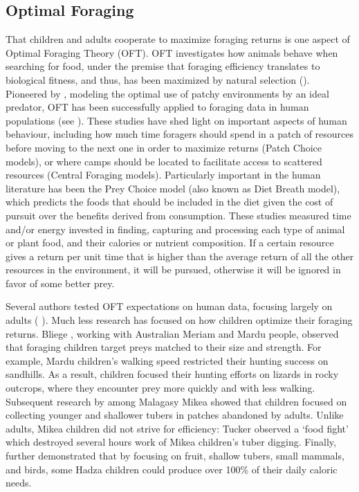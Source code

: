 \subsection{Optimal Foraging}
That children and adults cooperate to maximize foraging returns is one aspect of Optimal Foraging Theory (OFT). OFT investigates how animals behave when searching for food, under the premise that foraging efficiency translates to biological fitness, and thus, has been maximized by natural selection (\cite{pyke_optimal_1977}). Pioneered by \cite{macarthur_optimal_1966}, modeling the optimal use of patchy environments by an ideal predator, OFT has been successfully applied to foraging data in human populations  (see \cite{smith_anthropological_1983, hawkes_optimal_1992, winterhalder_hunter-gatherer_1981}). These studies have shed light on important aspects of human behaviour, including how much time foragers should spend in a patch of resources before moving to the next one in order to maximize returns (Patch Choice models), or where camps should be located to facilitate access to scattered resources (Central Foraging models). 
Particularly important in the human literature has been the Prey Choice model (also known as Diet Breath model), which predicts the foods that should be included in the diet given the cost of pursuit over the benefits derived from consumption. 
These studies measured time and/or energy invested in finding, capturing and processing each type of animal or plant food, and their calories or nutrient composition. If a certain resource gives a return per unit time that is higher than the average return of all the other resources in the environment, it will be pursued, otherwise it will be ignored in favor of some better prey.

Several authors tested OFT expectations on human data, focusing largely on adults (\cite{hill_foraging_1987} ). Much less research has focused on how children optimize their foraging returns. Bliege \cite{bird_children_1995, bird_ethnoarchaeology_2000, bird_constraints_2002, bird_children_2002, bird_mardu_2005}, working with Australian Meriam and Mardu people, observed that foraging children target preys matched to their size and strength. For example, Mardu children’s walking speed restricted their hunting success on sandhills. As a result, children focused their hunting efforts on lizards in rocky outcrops, where they encounter prey more quickly and with less walking. 
Subsequent research by \cite{tucker_growing_2005} among Malagasy Mikea showed that children focused on collecting younger and shallower tubers in patches abandoned by adults. Unlike adults, Mikea children did not strive for efficiency: Tucker observed a ‘food fight’ which destroyed several hours work of Mikea children’s tuber digging. Finally, \cite{crittenden_juvenile_2013} further  demonstrated that by focusing on fruit, shallow tubers, small mammals, and birds, some Hadza children could produce over 100\% of their daily caloric needs. 


